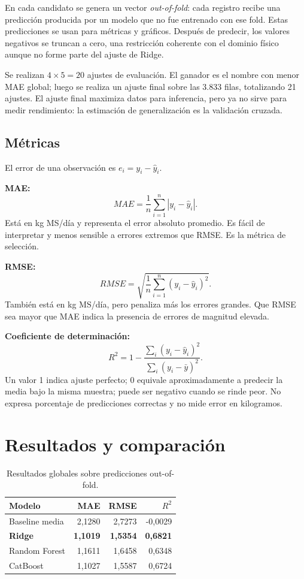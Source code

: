 \documentclass[11pt,a4paper]{article}
\begin{document}
En cada candidato se genera un vector \textit{out-of-fold}: cada registro recibe una predicción producida por un modelo que no fue entrenado con ese fold. Estas predicciones se usan para métricas y gráficos. Después de predecir, los valores negativos se truncan a cero, una restricción coherente con el dominio físico aunque no forme parte del ajuste de Ridge.

Se realizan $4\times5=20$ ajustes de evaluación. El ganador es el nombre con menor MAE global; luego se realiza un ajuste final sobre las 3.833 filas, totalizando 21 ajustes. El ajuste final maximiza datos para inferencia, pero ya no sirve para medir rendimiento: la estimación de generalización es la validación cruzada.

\subsection{Métricas}

El error de una observación es $e_i=y_i-\hat y_i$.

\textbf{MAE:}
\begin{equation}
MAE=\frac{1}{n}\sum_{i=1}^{n}|y_i-\hat y_i|.
\end{equation}
Está en kg MS/día y representa el error absoluto promedio. Es fácil de interpretar y menos sensible a errores extremos que RMSE. Es la métrica de selección.

\textbf{RMSE:}
\begin{equation}
RMSE=\sqrt{\frac{1}{n}\sum_{i=1}^{n}(y_i-\hat y_i)^2}.
\end{equation}
También está en kg MS/día, pero penaliza más los errores grandes. Que RMSE sea mayor que MAE indica la presencia de errores de magnitud elevada.

\textbf{Coeficiente de determinación:}
\begin{equation}
R^2=1-\frac{\sum_i(y_i-\hat y_i)^2}{\sum_i(y_i-\bar y)^2}.
\end{equation}
Un valor 1 indica ajuste perfecto; 0 equivale aproximadamente a predecir la media bajo la misma muestra; puede ser negativo cuando se rinde peor. No expresa porcentaje de predicciones correctas y no mide error en kilogramos.

\section{Resultados y comparación}

\begin{table}[H]
\centering
\caption{Resultados globales sobre predicciones out-of-fold.}
\begin{tabular}{lrrr}
\toprule
\textbf{Modelo} & \textbf{MAE} & \textbf{RMSE} & \textbf{$R^2$}\\
\midrule
Baseline media & 2,1280 & 2,7273 & -0,0029\\
\textbf{Ridge} & \textbf{1,1019} & \textbf{1,5354} & \textbf{0,6821}\\
Random Forest & 1,1611 & 1,6458 & 0,6348\\
CatBoost & 1,1027 & 1,5587 & 0,6724\\
\bottomrule
\end{tabular}
\end{table}
\end{document}
